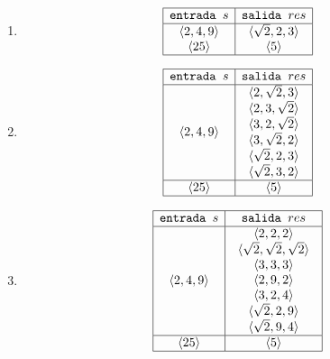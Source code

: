 \documentclass[12pt,a4paper,spanish]{article}
\begin{document}
\begin{enumerate}[label=\alph*)]
	\item
	      \[
		      \begin{array}{|c|c|}
			      \hline
			      \texttt{entrada } s & \texttt{salida } res       \\  \hline
			      \langle2, 4, 9\rangle & \langle\sqrt{2}, 2, 3\rangle \\
			      \langle25\rangle      & \langle5\rangle              \\\hline
		      \end{array}
	      \]

	\item
	      \def\salidaLarga{
		      \begin{array}{c}
			      \secuencia{2, \sqrt{2}, 3} \\
			      \secuencia{2, 3, \sqrt{2}} \\
			      \secuencia{3, 2, \sqrt{2}} \\
			      \secuencia{3, \sqrt{2}, 2} \\
			      \secuencia{\sqrt{2}, 2, 3} \\
			      \secuencia{\sqrt{2},3, 2}  \\
		      \end{array}
	      }
	      \[
		      \begin{array}{|c|c|}
			      \hline
			      \texttt{entrada } s & \texttt{salida } res \\  \hline
			      \secuencia{2, 4, 9} & \salidaLarga         \\ \hline
			      \secuencia{25}      & \secuencia{5}        \\ \hline
		      \end{array}
	      \]

	\item
	      \def\salidaLarga{
		      \begin{array}{c}
			      \secuencia{2, 2, 2}                      \\
			      \secuencia{\sqrt{2}, \sqrt{2}, \sqrt{2}} \\
			      \secuencia{3, 3, 3}                      \\
			      \secuencia{2,9, 2}                       \\
			      \secuencia{3, 2, 4}                      \\
			      \secuencia{\sqrt{2}, 2, 9}               \\
			      \secuencia{\sqrt{2},9, 4}                \\
		      \end{array}
	      }
	      \[
		      \begin{array}{|c|c|}
			      \hline
			      \texttt{entrada } s & \texttt{salida } res \\  \hline
			      \secuencia{2, 4, 9} & \salidaLarga         \\ \hline
			      \secuencia{25}      & \secuencia{5}        \\ \hline
		      \end{array}
	      \]


\end{enumerate}
\end{document}
